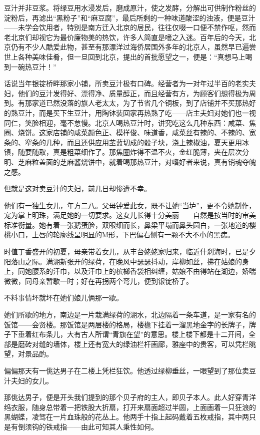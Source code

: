 \par 豆汁并非豆浆。将绿豆用水浸发后，磨成原汁，使之发酵，分解出可供制作粉丝的淀粉后，再滤出“黑粉子”和“麻豆腐”，最后所剩的一种味道酸涩的浊液，便是豆汁——未学会饮用者，特别是南方迁入北京的居民，往往仅啜一口便不禁作呕，然而老北京们却视它为最价廉物美的热饮，许多人简直是嗜之入迷。百年后的今天，北京仍有不少人酷爱此物，甚至有那漂洋过海侨居国外多年的北京人，虽然早已遍尝世上各种美味佳肴，但一旦回到北京，提出的首批愿望之一，便是：“真想马上喝到一碗热豆汁！”
\par 话说当年银锭桥畔那家小铺，所卖豆汁极有口碑。经营者为一对年过半百的老实夫妇，他们的豆汁发得好、漂得净、质量醇正，而且经营有方，为顾客们想得极为周到。有那家道已然没落的旗人老太太，为了节省几个铜板，到了店铺并不买那热好的熟豆汁，而是买下生豆汁，用陶钵装回家再热熟了吃——店主夫妇对她们也一视同仁，笑脸相迎，毫不怠慢。北京人喝热豆汁时，讲究吃这么几种东西：咸菜、焦圈、烧饼。这家店铺的咸菜颜色正、模样俊、味道香，咸菜丝有辣的、不辣的、宽条的、窄条的几种，而且还供应用苤蓝切成的骰子块，浇上辣椒油，夏天更用冰镇，随要随取，真是粗菜细作了。那焦圈炸得不温不火，金红脆薄，夹在层次分明、芝麻粒盖面的芝麻酱烧饼中，就着喝那热豆汁，对嗜好者来说，真有销魂夺魄之感。
\par 但就是这对卖豆汁的夫妇，前几日却惨遭不幸。
\par 他们有一独生女儿，年方二八。父母钟爱此女，既不让她“当垆”，更不令她制作，宠为掌上明珠，满足她的一切要求。这女儿长得十分美丽——自然是按当时的审美标准衡量。她有着一张鹅蛋脸，双眼细而长，鼻梁平塌而鼻头圆白，一张地道的樱桃小口，上唇的轮廓线呈明显的M形，下巴偏右侧有一颗不大不小的黑痣。
\par 时值丁香盛开的初夏，母亲带着女儿，从丰台姥姥家归来，临近什刹海时，已是夕阳落山之际。满湖新张开的绿荷，在晚风中瑟瑟抖动，岸柳如丝，拂在姑娘的身上，同她腰系的汗巾，以及汗巾上的槟榔香袋相纠缠，姑娘不由得站在湖边，娇喘微微，同母亲暂歇一时；好在再拐两个弯儿，便到银锭桥了。
\par 不料事情坏就坏在她们娘儿俩那一歇。
\par 她们所歇的地方，南边是一片栽满绿荷的湖水，北边隔着一条车道，是一家有名的饭馆——会贤楼。那饭馆是两层楼的格局，楼檐下挂着一溜黑地金字的长牌子，牌子下垂着红布条儿，大有古人所谓“青旗在望”的意思。楼上楼下都是十二开间，全部是磨砖对缝的墙体，楼上还有宽大的绿油栏杆画廊，雅座中的贵客，可以凭栏眺望，对景品酌。
\par 偏偏那天有一佻达男子在二楼上凭栏狂饮。他透过绿柳垂丝，一眼望到了那位卖豆汁夫妇的女儿。
\par 那佻达男子，便是开头我们提到的那个贝子府的主人，即贝子本人。此人好穿青洋绉衣服，随身总带着一把铁股大折扇，打开来扇面超过半圆，上面画着一只狂浪的黑蝴蝶，凌驾在一片血珠般的花丛上。他两手十指上起码戴着五枚戒指，其中两只是有倒须钩的铁戒指——由此可知其人秉性如何。
